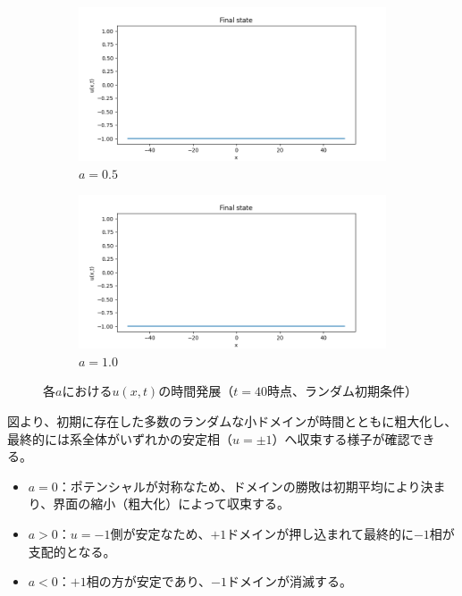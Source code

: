 \documentclass[a4paper,11pt]{article}
\begin{document}
\begin{figure}[H]
  \vspace{0.5cm}
  \begin{subfigure}[b]{0.45\textwidth}
    \centering
    \includegraphics[width=\textwidth]{tex_gif_figures/result_a0p5_eps0p5_final.png}
    \caption{$a = 0.5$}
  \end{subfigure}
  \hfill
  \begin{subfigure}[b]{0.45\textwidth}
    \centering
    \includegraphics[width=\textwidth]{tex_gif_figures/result_a1p0_eps0p5_final.png}
    \caption{$a = 1.0$}
  \end{subfigure}
  \caption{各$a$における$u(x,t)$の時間発展（$t = 40$時点、ランダム初期条件）}
  \label{fig:kadai1_snapshot}
\end{figure}

図より、初期に存在した多数のランダムな小ドメインが時間とともに粗大化し、最終的には系全体がいずれかの安定相（$u = \pm 1$）へ収束する様子が確認できる。

\begin{itemize}
  \item $a = 0$：ポテンシャルが対称なため、ドメインの勝敗は初期平均により決まり、界面の縮小（粗大化）によって収束する。
  \item $a > 0$：$u = -1$側が安定なため、$+1$ドメインが押し込まれて最終的に$-1$相が支配的となる。
  \item $a < 0$：$+1$相の方が安定であり、$-1$ドメインが消滅する。
\end{itemize}
\end{document}
